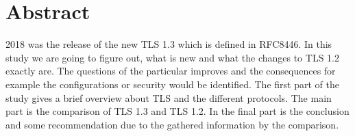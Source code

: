\chapter*{Abstract}
\label{chap:abstract}

2018 was the release of the new TLS 1.3 which is defined in RFC8446. 
In this study we are going to figure out, what is new and what the changes to TLS 1.2 exactly are. 
The questions of the particular improves and the consequences for example the configurations 
or security would be identified.
The first part of the study gives a brief overview about TLS and the different protocols. 
The main part is the comparison of TLS 1.3 and TLS 1.2.
In the final part is the conclusion and some recommendation due to the gathered information 
by the comparison.


